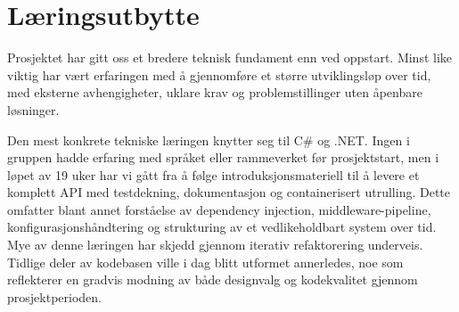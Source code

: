 \section{Læringsutbytte}
\label{sec:laering}


Prosjektet har gitt oss et bredere teknisk fundament enn ved oppstart. Minst like viktig har vært erfaringen med å gjennomføre et større utviklingsløp over tid, med eksterne avhengigheter, uklare krav og problemstillinger uten åpenbare løsninger.


Den mest konkrete tekniske læringen knytter seg til C\# og .NET. Ingen i gruppen hadde erfaring med språket eller rammeverket før prosjektstart, men i løpet av 19 uker har vi gått fra å følge introduksjonsmateriell til å levere et komplett API med testdekning, dokumentasjon og containerisert utrulling. Dette omfatter blant annet forståelse av dependency injection, middleware-pipeline, konfigurasjonshåndtering og strukturing av et vedlikeholdbart system over tid. Mye av denne læringen har skjedd gjennom iterativ refaktorering underveis. Tidlige deler av kodebasen ville i dag blitt utformet annerledes, noe som reflekterer en gradvis modning av både designvalg og kodekvalitet gjennom prosjektperioden.


